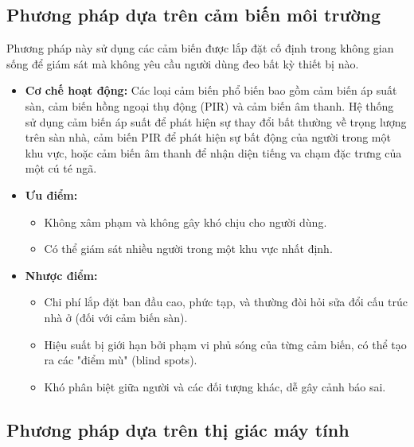 \subsection{Phương pháp dựa trên cảm biến môi trường}

Phương pháp này sử dụng các cảm biến được lắp đặt cố định trong không gian sống để giám sát mà không yêu cầu người dùng đeo bất kỳ thiết bị nào.
\begin{itemize}
    \item \textbf{Cơ chế hoạt động:} Các loại cảm biến phổ biến bao gồm cảm biến áp suất sàn, cảm biến hồng ngoại thụ động (PIR) và cảm biến âm thanh. Hệ thống sử dụng cảm biến áp suất để phát hiện sự thay đổi bất thường về trọng lượng trên sàn nhà, cảm biến PIR để phát hiện sự bất động của người trong một khu vực, hoặc cảm biến âm thanh để nhận diện tiếng va chạm đặc trưng của một cú té ngã.
    \item \textbf{Ưu điểm:} 
    \begin{itemize}
        \item Không xâm phạm và không gây khó chịu cho người dùng.
        \item Có thể giám sát nhiều người trong một khu vực nhất định.
    \end{itemize}
    \item \textbf{Nhược điểm:}
    \begin{itemize}
        \item Chi phí lắp đặt ban đầu cao, phức tạp, và thường đòi hỏi sửa đổi cấu trúc nhà ở (đối với cảm biến sàn).
        \item Hiệu suất bị giới hạn bởi phạm vi phủ sóng của từng cảm biến, có thể tạo ra các "điểm mù" (blind spots).
        \item Khó phân biệt giữa người và các đối tượng khác, dễ gây cảnh báo sai.
    \end{itemize}
\end{itemize}

\subsection{Phương pháp dựa trên thị giác máy tính}

